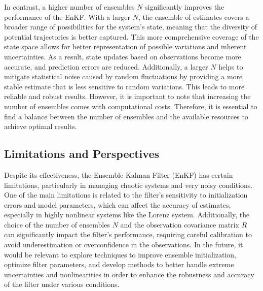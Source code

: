 \documentclass[a4paper,12pt,french]{article}
\begin{document}
In contrast, a higher number of ensembles $N$ significantly improves the performance of the EnKF. With a larger $N$, the ensemble of estimates covers a broader range of possibilities for the system's state, meaning that the diversity of potential trajectories is better captured. This more comprehensive coverage of the state space allows for better representation of possible variations and inherent uncertainties. As a result, state updates based on observations become more accurate, and prediction errors are reduced. Additionally, a larger $N$ helps to mitigate statistical noise caused by random fluctuations by providing a more stable estimate that is less sensitive to random variations. This leads to more reliable and robust results. However, it is important to note that increasing the number of ensembles comes with computational costs. Therefore, it is essential to find a balance between the number of ensembles and the available resources to achieve optimal results.

\subsection{Limitations and Perspectives}

Despite its effectiveness, the Ensemble Kalman Filter (EnKF) has certain limitations, particularly in managing chaotic systems and very noisy conditions. One of the main limitations is related to the filter's sensitivity to initialization errors and model parameters, which can affect the accuracy of estimates, especially in highly nonlinear systems like the Lorenz system. Additionally, the choice of the number of ensembles $N$ and the observation covariance matrix $R$ can significantly impact the filter's performance, requiring careful calibration to avoid underestimation or overconfidence in the observations. In the future, it would be relevant to explore techniques to improve ensemble initialization, optimize filter parameters, and develop methods to better handle extreme uncertainties and nonlinearities in order to enhance the robustness and accuracy of the filter under various conditions.



   

%
%
\end{document}
